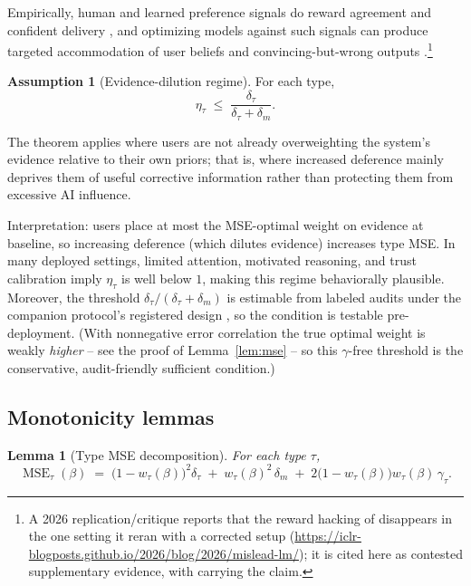 \documentclass[11pt]{article}
\newtheorem{lemma}[theorem]{Lemma}
\theoremstyle{definition}
\newtheorem{assumption}[theorem]{Assumption}
\theoremstyle{remark}
\numberwithin{equation}{section}
\DeclareMathOperator{\MSE}{MSE}
\begin{document}
Empirically, human and learned preference signals do reward agreement and confident delivery \citep{sharma2024towards, zhou2024relying}, and optimizing models against such signals can produce targeted accommodation of user beliefs and convincing-but-wrong outputs \citep{williams2025targeted, wen2025language}.\footnote{A 2026 replication/critique reports that the reward hacking of \citet{wen2025language} disappears in the one setting it reran with a corrected setup (\url{https://iclr-blogposts.github.io/2026/blog/2026/mislead-lm/}); it is cited here as contested supplementary evidence, with \citet{williams2025targeted} carrying the claim.}

\begin{assumption}[Evidence-dilution regime]\label{ass:dilution}
For each type,
\begin{equation}\label{eq:dilution}
\eta_\tau \;\le\; \frac{\delta_\tau}{\delta_\tau + \delta_m}.
\end{equation}
\end{assumption}

The theorem applies where users are not already overweighting the system's evidence relative to their own priors; that is, where increased deference mainly deprives them of useful corrective information rather than protecting them from excessive AI influence.

Interpretation: users place at most the MSE-optimal weight on evidence at baseline, so increasing deference (which dilutes evidence) increases type MSE. In many deployed settings, limited attention, motivated reasoning, and trust calibration imply $\eta_\tau$ is well below $1$, making this regime behaviorally plausible. Moreover, the threshold $\delta_\tau/(\delta_\tau + \delta_m)$ is estimable from labeled audits under the companion protocol's registered design \citep{hofheinz2026audit}, so the condition is testable pre-deployment. (With nonnegative error correlation the true optimal weight is weakly \emph{higher} -- see the proof of Lemma~\ref{lem:mse} -- so this $\gamma$-free threshold is the conservative, audit-friendly sufficient condition.)

\subsection{Monotonicity lemmas}\label{sec:lemmas}

\begin{lemma}[Type MSE decomposition]\label{lem:decomp}
For each type $\tau$,
\begin{equation}\label{eq:msedecomp}
\MSE_\tau(\beta) \;=\; \bigl(1 - w_\tau(\beta)\bigr)^2 \delta_\tau
\;+\; w_\tau(\beta)^2\, \delta_m
\;+\; 2\bigl(1 - w_\tau(\beta)\bigr) w_\tau(\beta)\, \gamma_\tau.
\end{equation}
\end{lemma}
\end{document}
